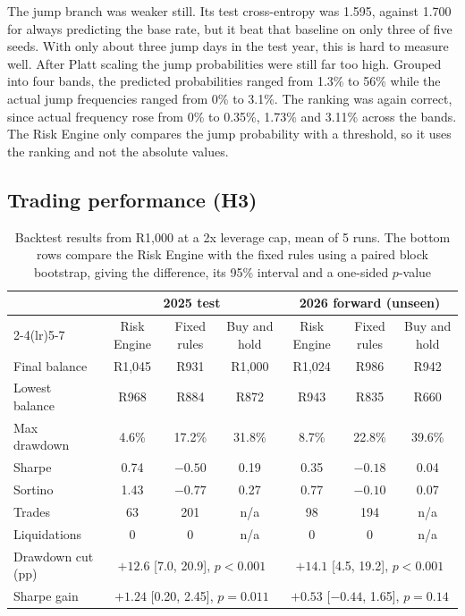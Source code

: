 The jump branch was weaker still. Its test cross-entropy was 1.595, against 1.700 for always predicting the base rate, but it beat that baseline on only three of five seeds. With only about three jump days in the test year, this is hard to measure well. After Platt scaling the jump probabilities were still far too high. Grouped into four bands, the predicted probabilities ranged from 1.3\% to 56\% while the actual jump frequencies ranged from 0\% to 3.1\%. The ranking was again correct, since actual frequency rose from 0\% to 0.35\%, 1.73\% and 3.11\% across the bands. The Risk Engine only compares the jump probability with a threshold, so it uses the ranking and not the absolute values.

\subsection{Trading performance (H3)}\label{sec:res-h3}

\begin{table}[!t]
  \centering
  \caption{Backtest results from R1{,}000 at a 2x leverage cap, mean of 5 runs. The bottom rows compare the Risk Engine with the fixed rules using a paired block bootstrap, giving the difference, its 95\% interval and a one-sided $p$-value}
  \label{tab:trading}
  \footnotesize
  \begin{tabular}{@{}lcccccc@{}}
    \toprule
    & \multicolumn{3}{c}{2025 test} & \multicolumn{3}{c}{2026 forward (unseen)} \\
    \cmidrule(lr){2-4}\cmidrule(lr){5-7}
    & Risk Engine & Fixed rules & Buy and hold & Risk Engine & Fixed rules & Buy and hold \\
    \midrule
    Final balance  & R1{,}045 & R931 & R1{,}000 & R1{,}024 & R986 & R942 \\
    Lowest balance & R968 & R884 & R872 & R943 & R835 & R660 \\
    Max drawdown   & 4.6\% & 17.2\% & 31.8\% & 8.7\% & 22.8\% & 39.6\% \\
    Sharpe         & 0.74 & $-0.50$ & 0.19 & 0.35 & $-0.18$ & 0.04 \\
    Sortino        & 1.43 & $-0.77$ & 0.27 & 0.77 & $-0.10$ & 0.07 \\
    Trades         & 63 & 201 & n/a & 98 & 194 & n/a \\
    Liquidations   & 0 & 0 & n/a & 0 & 0 & n/a \\
    \midrule
    Drawdown cut (pp) & \multicolumn{3}{c}{$+12.6$ [7.0, 20.9], $p<0.001$} & \multicolumn{3}{c}{$+14.1$ [4.5, 19.2], $p<0.001$} \\
    Sharpe gain       & \multicolumn{3}{c}{$+1.24$ [0.20, 2.45], $p=0.011$} & \multicolumn{3}{c}{$+0.53$ [$-0.44$, 1.65], $p=0.14$} \\
    \bottomrule
  \end{tabular}
\end{table}

